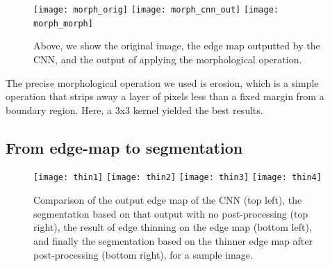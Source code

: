 \documentclass[10pt, twocolumn, twoside]{article}
\newcommand{\squeezeup}{\vspace{-2.5mm}}
\begin{document}
\begin{figure}[h!]
    \centering
    \texttt{[image: morph\_orig]}
    \vspace{5mm}
    \texttt{[image: morph\_cnn\_out]}
    \texttt{[image: morph\_morph]}
    \caption{Above, we show the original image, the edge map outputted by the CNN, and the output of applying the morphological operation.}
    \label{fig:11}
\end{figure}



The precise morphological operation we used is erosion, which is a simple operation that strips away a layer of pixels less than a fixed margin from a boundary region. Here, a 3x3 kernel yielded the best results.



\subsection{From edge-map to segmentation}
\squeezeup
\begin{figure}[ht]
    \centering
    \texttt{[image: thin1]}
    \texttt{[image: thin2]}
    \texttt{[image: thin3]}
    \texttt{[image: thin4]}    
    \caption{Comparison of the output edge map of the CNN (top left), the segmentation based on that output with no post-processing (top right), the result of edge thinning on the edge map (bottom left), and finally the segmentation based on the thinner edge map after post-processing (bottom right), for a sample image.}
    \label{fig:thinning}
\end{figure}
\end{document}
